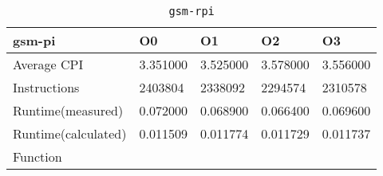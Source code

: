 \begin{table}[ht!]
\centering
\caption{\texttt{gsm-rpi}}
\label{tab:gsm-rpi}
\begin{tabular}{|l|l|l|l|l|}
\hline
\textbf{gsm-pi}	&	\textbf{O0}	&	\textbf{O1}	&	\textbf{O2}	&	\textbf{O3}	\\\hline\hline
Average CPI	&	3.351000	&	3.525000	&	3.578000	&	3.556000	\\\hline
Instructions	&	2403804	&	2338092	&	2294574	&	2310578	\\\hline
Runtime(measured)	&	0.072000	&	0.068900	&	0.066400	&	0.069600	\\\hline
Runtime(calculated)	&	0.011509	&	0.011774	&	0.011729	&	0.011737	\\\hline
Function	&		&		&		&		\\\hline
\end{tabular}
\end{table}
